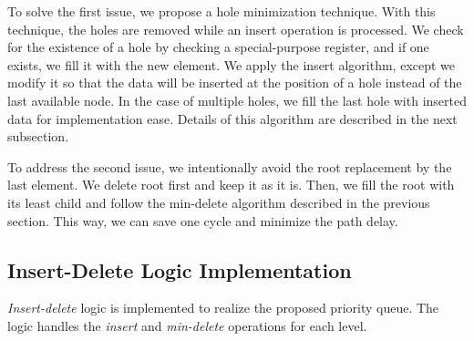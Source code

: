 To solve the first issue, we propose a hole minimization technique.
With this technique, the holes are removed while an insert operation is processed.
We check for the existence of a hole by checking a special-purpose register, and if one exists, we fill it with the new element.
We apply the insert algorithm, except we modify it so that the data will be inserted at the position of a hole instead of the last available node.
In the case of multiple holes, we fill the last hole with inserted data for implementation ease.
Details of this algorithm are described in the next subsection.

To address the second issue, we intentionally avoid the root replacement by the last element.
We delete root first and keep it as it is.
Then, we fill the root with its least child and follow the min-delete algorithm described in the previous section.
This way, we can save one cycle and minimize the path delay.

\subsection{Insert-Delete Logic Implementation}

{\it Insert-delete} logic is implemented to realize the proposed priority queue.
The logic handles the {\it insert} and {\it min-delete} operations for each level.

